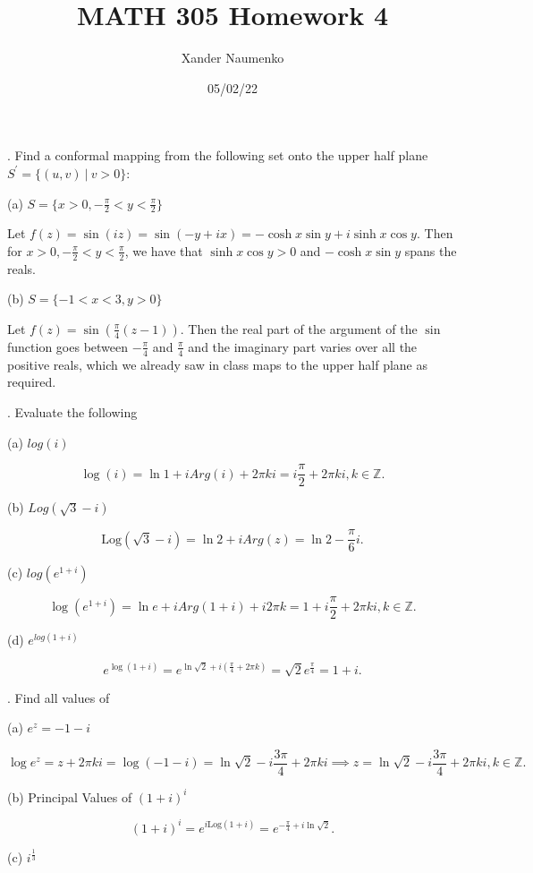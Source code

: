 \documentclass[letterpaper, reqno,11pt]{article}
\begin{document}
\title{MATH 305 Homework 4}
\date{05/02/22}
\author{Xander Naumenko}
\maketitle

. Find a conformal mapping from the following set onto the upper half plane $ S^{'}=\{(u,v) \ | \ v>0\}$:

(a) $ S= \{  x>0, -\frac{\pi}{2}<y<\frac{\pi}{2} \}$

Let $f(z)=\sin(iz)=\sin(-y+ix)=-\cosh x\sin y+i\sinh x\cos y$. Then for $x>0, -\frac{\pi}{2}<y<\frac{\pi}{2}$, we have that $\sinh x\cos y>0$ and $-\cosh x\sin y$ spans the reals. 

(b) $ S= \{ -1<x<3, y>0\}$

Let $f(z)=\sin\left( \frac{\pi}{4}(z-1) \right) $. Then the real part of the argument of the $\sin$ function goes between $-\frac{\pi}{4}$ and $\frac{\pi}{4}$ and the imaginary part varies over all the positive reals, which we already saw in class maps to the upper half plane as required. 

. Evaluate the following

(a) $log (i)$

\[
\log(i)=\ln 1+iArg(i)+2\pi ki=i\frac{\pi}{2}+2\pi ki, k\in\mathbb{Z}
.\]

(b) $Log (\sqrt{3}-i)$

\[
\text{Log}(\sqrt{3} -i)=\ln 2+iArg(z)=\ln 2-\frac{\pi}{6}i
.\]

(c)  $ log ( e^{1+i})$

\[
\log(e^{1+i})=\ln e+iArg(1+i)+i 2\pi k=1+i\frac{\pi}{2}+2\pi ki, k\in\mathbb{Z}
.\]

(d) $e^{log (1+i)}$

\[
e^{\log(1+i)}=e^{\ln\sqrt{2} +i\left( \frac{\pi}{4}+2\pi k \right) }=\sqrt{2} e^{\frac{\pi}{4}}=1+i
.\]


\medskip

. Find all values of

(a) $ e^z= -1-i$

\[
\log e^{z}=z+2\pi ki=\log(-1-i)=\ln\sqrt{2} -i \frac{3\pi}{4}+2\pi ki\implies z=\ln\sqrt{2} -i \frac{3\pi}{4}+2\pi ki, k\in\mathbb{Z}
.\]

(b) Principal Values of $ (1+i)^{i}$

\[
    (1+i)^{i}=e^{i\text{Log}(1+i)}=e^{-\frac{\pi}{4}+i\ln \sqrt{2} }
.\]

(c) $i^{\frac{1}{3}}$
\end{document}
